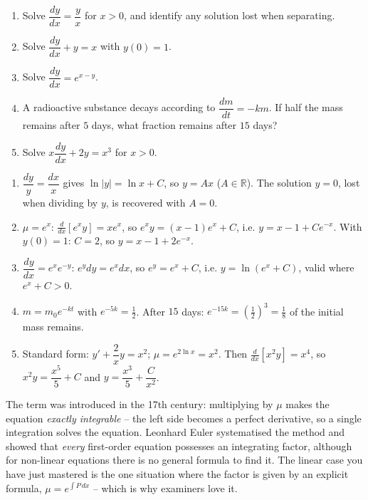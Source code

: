 \documentclass[11pt]{article}
\begin{document}
\begin{exercice}[Practice]
\begin{enumerate}
\item Solve $\dfrac{dy}{dx} = \dfrac{y}{x}$ for $x > 0$, and identify any solution lost when separating.
\item Solve $\dfrac{dy}{dx} + y = x$ with $y(0) = 1$.
\item Solve $\dfrac{dy}{dx} = e^{x - y}$.
\item A radioactive substance decays according to $\dfrac{dm}{dt} = -km$. If half the mass remains after $5$ days, what fraction remains after $15$ days?
\item Solve $x\dfrac{dy}{dx} + 2y = x^3$ for $x > 0$.
\end{enumerate}
\end{exercice}

\begin{corrige}[Exercise 1]
\begin{enumerate}
\item $\dfrac{dy}{y} = \dfrac{dx}{x}$ gives $\ln|y| = \ln x + C$, so $y = Ax$ ($A \in \mathbb{R}$). The solution $y = 0$, lost when dividing by $y$, is recovered with $A = 0$.
\item $\mu = e^{x}$: $\frac{d}{dx}[e^{x}y] = xe^{x}$, so $e^{x}y = (x-1)e^{x} + C$, i.e. $y = x - 1 + Ce^{-x}$. With $y(0) = 1$: $C = 2$, so $y = x - 1 + 2e^{-x}$.
\item $\dfrac{dy}{dx} = e^{x}e^{-y}$: $e^{y}dy = e^{x}dx$, so $e^{y} = e^{x} + C$, i.e. $y = \ln(e^{x} + C)$, valid where $e^{x} + C > 0$.
\item $m = m_0 e^{-kt}$ with $e^{-5k} = \tfrac12$. After $15$ days: $e^{-15k} = \left(\tfrac12\right)^3 = \tfrac18$ of the initial mass remains.
\item Standard form: $y' + \dfrac{2}{x}y = x^2$; $\mu = e^{2\ln x} = x^2$. Then $\frac{d}{dx}[x^2 y] = x^4$, so $x^2 y = \dfrac{x^5}{5} + C$ and $y = \dfrac{x^3}{5} + \dfrac{C}{x^2}$.
\end{enumerate}
\end{corrige}

\begin{savaistu}
The term was introduced in the 17th century: multiplying by $\mu$ makes the equation \emph{exactly integrable} -- the left side becomes a perfect derivative, so a single integration solves the equation. Leonhard Euler systematised the method and showed that \emph{every} first-order equation possesses an integrating factor, although for non-linear equations there is no general formula to find it. The linear case you have just mastered is the one situation where the factor is given by an explicit formula, $\mu = e^{\int P\,dx}$ -- which is why examiners love it.
\end{savaistu}
\end{document}
